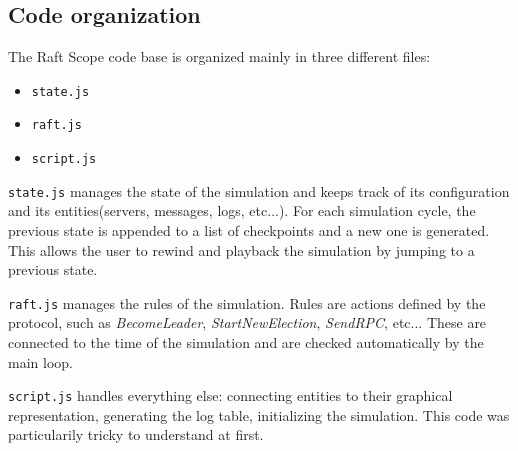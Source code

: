 \subsection{Code organization}
The Raft Scope code base is organized mainly in three different files:
\begin{itemize}
\item \texttt{state.js}
\item \texttt{raft.js}
\item \texttt{script.js}
\end{itemize}

\texttt{state.js} manages the state of the simulation and keeps track of its configuration and its entities(servers,
messages, logs, etc...).
For each simulation cycle, the previous state is appended to a list of checkpoints and a new one is generated. This allows
the user to rewind and playback the simulation by jumping to a previous state.

\texttt{raft.js} manages the rules of the simulation. Rules are actions defined by the protocol,
such as \textit{BecomeLeader}, \textit{StartNewElection}, \textit{SendRPC}, etc... These are connected to the time of the simulation and are checked
automatically by the main loop.

\texttt{script.js} handles everything else: connecting entities to their graphical representation, generating the log table,
 initializing the simulation. This code was particularily tricky to understand at first.
